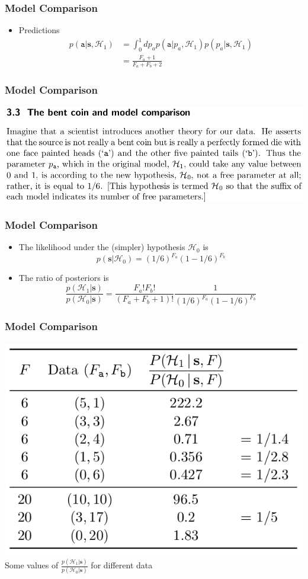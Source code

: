\documentclass{beamer}
\begin{document}
\begin{frame}
	\frametitle{Model Comparison}
\begin{itemize}
\item Predictions
	\begin{align*}
	p(\mathtt{a}|\mathbf{s}, \mathcal{H}_1) &= \int_0^1 dp_a p(\mathtt{a}|p_a,\mathcal{H}_1)p(p_a|\mathbf{s},\mathcal{H}_1)\\
	& = \frac{F_a+1}{F_a+F_b+2}
	\end{align*}
\end{itemize}
\end{frame}


\begin{frame}
	\frametitle{Model Comparison}
   \includegraphics[width=.8\textwidth]{e15}\\
\end{frame}



\begin{frame}
	\frametitle{Model Comparison}
   \begin{itemize}
\item The likelihood under the (simpler) hypothesis $\mathcal{H}_0$ is
	$$p(\mathbf{s}|\mathcal{H}_0) = (1/6)^{F_a} (1-1/6)^{F_b}$$
\item The ratio of posteriors is
	$$\frac{p(\mathcal{H}_1|\mathbf{s})}{p(\mathcal{H}_0|\mathbf{s})} = \frac{F_a!F_b!}{(F_a+F_b+1)!} \frac{1}{(1/6)^{F_a} (1-1/6)^{F_b}}$$
\end{itemize}
\end{frame}


\begin{frame}
	\frametitle{Model Comparison}
   \includegraphics[width=.8\textwidth]{e16}\\
	Some values of $\frac{p(\mathcal{H}_1|\mathbf{s})}{p(\mathcal{H}_0|\mathbf{s})} $ for different data
\end{frame}
\end{document}
